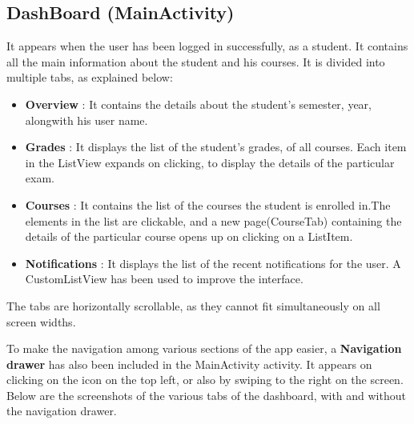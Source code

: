 \documentclass{article}
\begin{document}
\subsection{DashBoard (MainActivity)}
It appears when the user has been logged in successfully, as a student. It contains all the main information about the student and his courses.
It is divided into multiple tabs, as explained below:
\begin{itemize}
\item \textbf{Overview} : It contains the details about the student's semester, year, alongwith his user name.
\item \textbf{Grades} : It displays the list of the student's grades, of all courses. Each item in the ListView expands on clicking, to display the details of the particular exam.
\item \textbf{Courses} : It contains the list of the courses the student is enrolled in.The elements in the list are clickable, and a new page(CourseTab) containing the details of the particular course opens up on clicking on a ListItem.
\item \textbf{Notifications} : It displays the list of the recent notifications for the user. A CustomListView has been used to improve the interface.
\end{itemize}
\par\noindent The tabs are horizontally scrollable, as they cannot fit simultaneously on all screen widths.
\par\noindent To make the navigation among various sections of the app easier, a \textbf{Navigation drawer} has also been included in the MainActivity activity. It appears on clicking on the icon on the top left, or also by swiping to the right on the screen.
 Below are the screenshots of the various tabs of the dashboard, with and without the navigation drawer.
\end{document}
